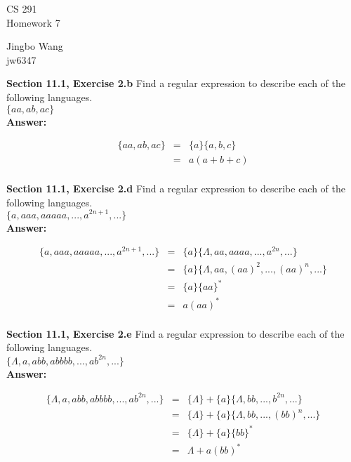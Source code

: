 \documentclass[12pt]{article}
\begin{document}
\begin{center}
{\large CS 291}\\
Homework 7
\end{center}

\begin{flushright}
Jingbo Wang\\
jw6347
\end{flushright}

\textbf{Section 11.1, Exercise 2.b}  Find a regular expression to describe each of the following languages.\\
 $\{aa, ab, ac\}$\\

\textbf{Answer:}

\begin{center}
\begin{eqnarray*}
\{aa, ab, ac\} 
& = & \{a\} \{a, b, c\} \\
& = & a(a+b+c)\\
\end{eqnarray*}
\end{center}

\textbf{Section 11.1, Exercise 2.d}  Find a regular expression to describe each of the following languages.\\
  $\{a, aaa, aaaaa, ... , a^{2n+1}, . . . \}$\\

\textbf{Answer:}

\begin{center}
\begin{eqnarray*}
\{a, aaa, aaaaa, ... , a^{2n+1}, . . . \} 
& = & \{a\} \{\Lambda, aa, aaaa, ... , a^{2n}, ...\} \\
& = & \{a\} \{\Lambda, aa, (aa)^2, ... , (aa)^n, ...\}\\
& = & \{a\} \{aa\}^*\\
& = & a(aa)^*\\
\end{eqnarray*}
\end{center}

\textbf{Section 11.1, Exercise 2.e}  Find a regular expression to describe each of the following languages.\\
  $\{\Lambda, a, abb, abbbb, ... , ab^{2n}, . . . \}$\\

\textbf{Answer:}

\begin{center}
\begin{eqnarray*}
\{\Lambda, a, abb, abbbb, ... , ab^{2n}, . . . \} 
& = & \{\Lambda\} + \{a\} \{\Lambda, bb, ... , b^{2n}, ...\}\\
& = & \{\Lambda\} + \{a\} \{\Lambda, bb, ... , (bb)^n, ...\}\\
& = & \{\Lambda\} + \{a\} \{bb\}^*\\
& = & \Lambda + a(bb)^*\\
\end{eqnarray*}
\end{center}
\end{document}
